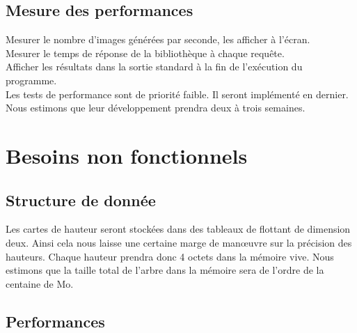 \documentclass[12pt]{report}
\begin{document}
\subsection{Mesure des performances}

Mesurer le nombre d'images générées par seconde, les afficher à l'écran.\\
Mesurer le temps de réponse de la bibliothèque à chaque requête.\\
Afficher les résultats dans la sortie standard à la fin de l'exécution
du programme.\\

Les tests de performance sont de priorité faible. Il seront implémenté
en dernier. Nous estimons que leur développement prendra deux à trois
semaines.\\


\section{Besoins non fonctionnels}

\subsection{Structure de donnée}

Les cartes de hauteur seront stockées dans des tableaux de flottant de dimension 
deux. Ainsi cela nous laisse une certaine marge de manœuvre sur la précision des 
hauteurs. Chaque hauteur prendra donc 4 octets dans la mémoire vive. Nous estimons 
que la taille total de l'arbre dans la mémoire sera de l'ordre de la
centaine de Mo.\\


\subsection{Performances}
\end{document}
